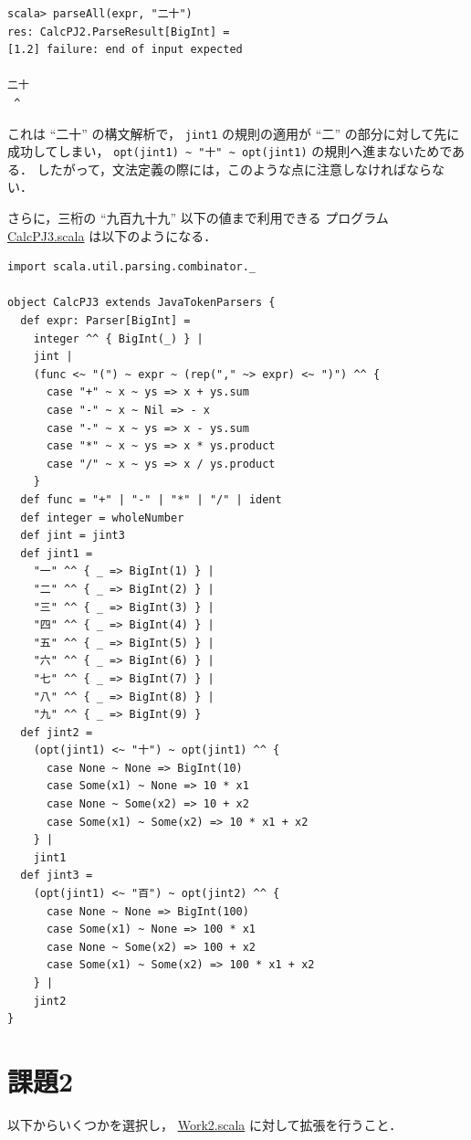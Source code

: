 \documentclass[a4j]{jsarticle}
\begin{document}
\begin{verbatim}
scala> parseAll(expr, "二十")
res: CalcPJ2.ParseResult[BigInt] =
[1.2] failure: end of input expected

二十
 ^
\end{verbatim}

これは ``二十'' の構文解析で， \texttt{jint1} の規則の適用が ``二'' の部分に対して先に成功してしまい，
\texttt{opt(jint1) \textasciitilde{} "十" \textasciitilde{} opt(jint1)} の規則へ進まないためである．
したがって，文法定義の際には，このような点に注意しなければならない．

さらに，三桁の ``九百九十九'' 以下の値まで利用できる
プログラム \href{file:///home/tamura/lect2/ProLang/2018/org/prog/parser/CalcPJ3.scala}{CalcPJ3.scala} は以下のようになる．


\begin{verbatim}
import scala.util.parsing.combinator._

object CalcPJ3 extends JavaTokenParsers {
  def expr: Parser[BigInt] =
    integer ^^ { BigInt(_) } |
    jint |
    (func <~ "(") ~ expr ~ (rep("," ~> expr) <~ ")") ^^ {
      case "+" ~ x ~ ys => x + ys.sum
      case "-" ~ x ~ Nil => - x
      case "-" ~ x ~ ys => x - ys.sum
      case "*" ~ x ~ ys => x * ys.product
      case "/" ~ x ~ ys => x / ys.product
    }
  def func = "+" | "-" | "*" | "/" | ident
  def integer = wholeNumber
  def jint = jint3
  def jint1 =
    "一" ^^ { _ => BigInt(1) } |
    "二" ^^ { _ => BigInt(2) } |
    "三" ^^ { _ => BigInt(3) } |
    "四" ^^ { _ => BigInt(4) } |
    "五" ^^ { _ => BigInt(5) } |
    "六" ^^ { _ => BigInt(6) } |
    "七" ^^ { _ => BigInt(7) } |
    "八" ^^ { _ => BigInt(8) } |
    "九" ^^ { _ => BigInt(9) }
  def jint2 =
    (opt(jint1) <~ "十") ~ opt(jint1) ^^ {
      case None ~ None => BigInt(10)
      case Some(x1) ~ None => 10 * x1
      case None ~ Some(x2) => 10 + x2
      case Some(x1) ~ Some(x2) => 10 * x1 + x2
    } |
    jint1
  def jint3 =
    (opt(jint1) <~ "百") ~ opt(jint2) ^^ {
      case None ~ None => BigInt(100)
      case Some(x1) ~ None => 100 * x1
      case None ~ Some(x2) => 100 + x2
      case Some(x1) ~ Some(x2) => 100 * x1 + x2
    } |
    jint2
}
\end{verbatim}
\section{課題2}
\label{sec-7}

以下からいくつかを選択し， \href{file:///home/tamura/lect2/ProLang/2018/org/prog/parser/Work2.scala}{Work2.scala} に対して拡張を行うこと．
\end{document}
